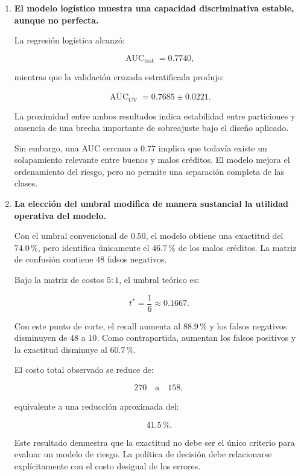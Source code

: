 \begin{enumerate}
    En particular, una unidad adicional en la escala de carga de la cuota
    se asoció con un aumento aproximado del \(22.8\,\%\) en las
    \textit{odds} de mal crédito:

    \[
    \mathrm{OR}=1.2283.
    \]

    Los niveles elevados de ahorro y la vivienda propia mostraron menores
    \textit{odds} respecto de sus categorías de referencia. Estas
    relaciones sugieren que la evaluación del riesgo debe considerar el
    perfil financiero completo y no una característica aislada.

    \item \textbf{El modelo logístico muestra una capacidad
    discriminativa estable, aunque no perfecta.}

    La regresión logística alcanzó:

    \[
    \operatorname{AUC}_{\mathrm{test}}
    =
    0.7740,
    \]

    mientras que la validación cruzada estratificada produjo:

    \[
    \overline{\operatorname{AUC}}_{\mathrm{CV}}
    =
    0.7685
    \pm
    0.0221.
    \]

    La proximidad entre ambos resultados indica estabilidad entre
    particiones y ausencia de una brecha importante de sobreajuste bajo
    el diseño aplicado.

    Sin embargo, una AUC cercana a \(0.77\) implica que todavía existe un
    solapamiento relevante entre buenos y malos créditos. El modelo mejora
    el ordenamiento del riesgo, pero no permite una separación completa
    de las clases.

    \item \textbf{La elección del umbral modifica de manera sustancial
    la utilidad operativa del modelo.}

    Con el umbral convencional de \(0.50\), el modelo obtiene una exactitud
    del \(74.0\,\%\), pero identifica únicamente el \(46.7\,\%\) de los
    malos créditos. La matriz de confusión contiene \(48\) falsos
    negativos.

    Bajo la matriz de costos \(5:1\), el umbral teórico es:

    \[
    t^{*}
    =
    \frac{1}{6}
    \approx
    0.1667.
    \]

    Con este punto de corte, el recall aumenta al \(88.9\,\%\) y los
    falsos negativos disminuyen de \(48\) a \(10\). Como contrapartida,
    aumentan los falsos positivos y la exactitud disminuye al
    \(60.7\,\%\).

    El costo total observado se reduce de:

    \[
    270
    \quad\text{a}\quad
    158,
    \]

    equivalente a una reducción aproximada del:

    \[
    41.5\,\%.
    \]

    Este resultado demuestra que la exactitud no debe ser el único criterio
    para evaluar un modelo de riesgo. La política de decisión debe
    relacionarse explícitamente con el costo desigual de los errores.

\end{enumerate}

